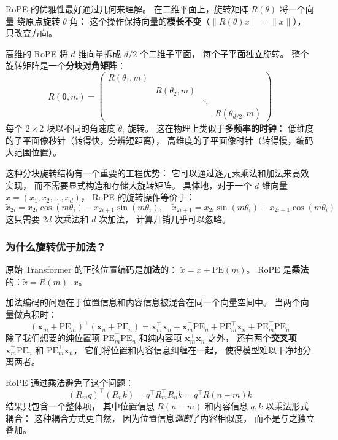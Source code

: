 RoPE 的优雅性最好通过几何来理解。
在二维平面上，旋转矩阵 $R(\theta)$ 将一个向量
绕原点旋转 $\theta$ 角：
这个操作保持向量的\textbf{模长不变}（$\|R(\theta)x\| = \|x\|$），
只改变方向。

高维的 RoPE 将 $d$ 维向量拆成 $d/2$ 个二维子平面，
每个子平面独立旋转。
整个旋转矩阵是一个\textbf{分块对角矩阵}：
\[
  R(\boldsymbol{\theta}, m) = \begin{pmatrix}
    R(\theta_1, m) & & \\
    & R(\theta_2, m) & \\
    & & \ddots \\
    & & & R(\theta_{d/2}, m)
  \end{pmatrix}
\]
每个 $2 \times 2$ 块以不同的角速度 $\theta_i$ 旋转。
这在物理上类似于\textbf{多频率的时钟}：
低维度的子平面像秒针（转得快，分辨短距离），
高维度的子平面像时针（转得慢，编码大范围位置）。

这种分块旋转结构有一个重要的工程优势：
它可以通过逐元素乘法和加法来高效实现，
而不需要显式构造和存储大旋转矩阵。
具体地，对于一个 $d$ 维向量 $x = (x_1, x_2, \ldots, x_d)$，
RoPE 的旋转操作等价于：
\[
  \tilde{x}_{2i} = x_{2i} \cos(m\theta_i) - x_{2i+1} \sin(m\theta_i), \quad
  \tilde{x}_{2i+1} = x_{2i} \sin(m\theta_i) + x_{2i+1} \cos(m\theta_i)
\]
这只需要 $2d$ 次乘法和 $d$ 次加法，
计算开销几乎可以忽略。

\subsubsection{为什么旋转优于加法？}

原始 Transformer 的正弦位置编码是\textbf{加法}的：
$\tilde{x} = x + \mathrm{PE}(m)$。
RoPE 是\textbf{乘法}的：$\tilde{x} = R(m) \cdot x$。

加法编码的问题在于位置信息和内容信息被混合在同一个向量空间中。
当两个向量做点积时：
\[
  (\mathbf{x}_m + \mathrm{PE}_m)^\top (\mathbf{x}_n + \mathrm{PE}_n)
  = \mathbf{x}_m^\top \mathbf{x}_n + \mathbf{x}_m^\top \mathrm{PE}_n
    + \mathrm{PE}_m^\top \mathbf{x}_n + \mathrm{PE}_m^\top \mathrm{PE}_n
\]
除了我们想要的纯位置项 $\mathrm{PE}_m^\top \mathrm{PE}_n$
和纯内容项 $\mathbf{x}_m^\top \mathbf{x}_n$ 之外，
还有两个\textbf{交叉项} $\mathbf{x}_m^\top \mathrm{PE}_n$
和 $\mathrm{PE}_m^\top \mathbf{x}_n$，
它们将位置和内容信息纠缠在一起，
使得模型难以干净地分离两者。

RoPE 通过乘法避免了这个问题：
\[
  (R_m q)^\top (R_n k) = q^\top R_m^\top R_n k = q^\top R(n-m) k
\]
结果只包含一个整体项，
其中位置信息 $R(n-m)$ 和内容信息 $q, k$ 以乘法形式耦合：
这种耦合方式更自然，
因为位置信息\emph{调制}了内容相似度，
而不是与之独立叠加。


